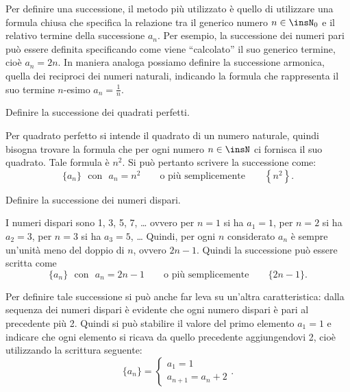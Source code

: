 Per definire una successione, il metodo più utilizzato è quello di utilizzare una formula chiusa che specifica la relazione tra il generico numero $n\in\insN_0$ e il relativo termine della successione $a_n$. Per esempio, la successione dei numeri pari può essere definita specificando come viene ``calcolato'' il suo generico termine, cioè $a_n=2n$. In maniera analoga possiamo definire la successione armonica, quella dei reciproci dei numeri naturali, indicando la formula che rappresenta il suo termine $n$-esimo $a_n=\frac{1}{n}$.

\pagebreak
\begin{exrig}
\begin{esempio}
Definire la successione dei quadrati perfetti.

Per quadrato perfetto si intende il quadrato di un numero naturale, quindi bisogna trovare la formula che per ogni numero $n\in\insN$ ci fornisca il suo quadrato. Tale formula è $n^2$. Si può pertanto scrivere la successione come:
\[\{a_n\}\text{~~con~~}a_n=n^2\qquad\text{o più semplicemente}\qquad\left\{n^2\right\}.\]
\end{esempio}

\begin{esempio}\label{es:def_ricorsiva}
Definire la successione dei numeri dispari.

I numeri dispari sono 1, 3, 5, 7, \ldots{} ovvero per $n=1$ si ha $a_1=1$, per $n=2$ si ha $a_2=3$, per $n=3$ si ha $a_3=5$, \ldots{} Quindi, per ogni $n$ considerato $a_n$ è sempre un'unità meno del doppio di $n$, ovvero $2n-1$. Quindi la successione può essere scritta come
\[\{a_n\}\text{~~con~~}a_n=2n-1\qquad\text{o più semplicemente}\qquad\{2n-1\}.\]

Per definire tale successione si può anche far leva su un'altra caratteristica: dalla sequenza dei numeri dispari è evidente che ogni numero dispari è pari al precedente più 2. Quindi si può stabilire il valore del primo elemento $a_1=1$ e indicare che ogni elemento si ricava da quello precedente aggiungendovi 2, cioè utilizzando la scrittura seguente:
\[\{a_n\}=\left\{\begin{array}{l}a_1=1\\a_{n+1}=a_n+2\end{array}\right..\]
\end{esempio}
\end{exrig}

